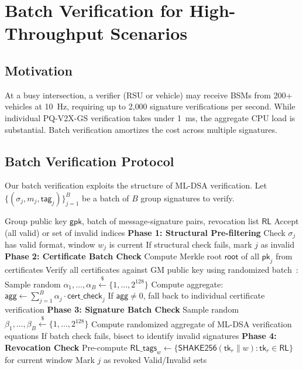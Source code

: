\documentclass[conference,10pt]{IEEEtran}
\newcommand{\shake}{\textsf{SHAKE256}}
\begin{document}
\section{Batch Verification for High-Throughput Scenarios}
\label{sec:batch}

\subsection{Motivation}

At a busy intersection, a verifier (RSU or vehicle) may receive BSMs from 200+ vehicles at 10~Hz, requiring up to 2{,}000 signature verifications per second. While individual PQ-V2X-GS verification takes under 1~ms, the aggregate CPU load is substantial. Batch verification amortizes the cost across multiple signatures.

\subsection{Batch Verification Protocol}

Our batch verification exploits the structure of ML-DSA verification. Let $\{(\sigma_j, m_j, \mathsf{tag}_j)\}_{j=1}^{B}$ be a batch of $B$ group signatures to verify.

\begin{algorithm}[h]
\caption{$\mathsf{BatchVerify}(\mathsf{gpk}, \{(m_j, \sigma_j)\}_{j=1}^B, \mathsf{RL})$}
\label{alg:batch}
\begin{algorithmic}[1]
\REQUIRE Group public key $\mathsf{gpk}$, batch of message-signature pairs, revocation list $\mathsf{RL}$
\ENSURE Accept (all valid) or set of invalid indices
\STATE \textbf{Phase 1: Structural Pre-filtering}
    \STATE Check $\sigma_j$ has valid format, window $w_j$ is current
    \STATE If structural check fails, mark $j$ as invalid
\ENDFOR
\STATE \textbf{Phase 2: Certificate Batch Check}
\STATE Compute Merkle root $\mathsf{root}$ of all $\mathsf{pk}_j$ from certificates
\STATE Verify all certificates against GM public key using randomized batch~\cite{bellare1998}:
\STATE Sample random $\alpha_1, \ldots, \alpha_B \xleftarrow{\$} \{1, \ldots, 2^{128}\}$
\STATE Compute aggregate: $\mathsf{agg} \leftarrow \sum_{j=1}^{B} \alpha_j \cdot \mathsf{cert\_check}_j$
\STATE If $\mathsf{agg} \neq 0$, fall back to individual certificate verification
\STATE \textbf{Phase 3: Signature Batch Check}
\STATE Sample random $\beta_1, \ldots, \beta_B \xleftarrow{\$} \{1, \ldots, 2^{128}\}$
\STATE Compute randomized aggregate of ML-DSA verification equations
\STATE If batch check fails, bisect to identify invalid signatures
\STATE \textbf{Phase 4: Revocation Check}
\STATE Pre-compute $\mathsf{RL\_tags}_w \leftarrow \{\shake(\mathsf{tk}_r \| w) : \mathsf{tk}_r \in \mathsf{RL}\}$ for current window
        \STATE Mark $j$ as revoked
    \ENDIF
\ENDFOR
\RETURN Valid/Invalid sets
\end{algorithmic}
\end{algorithm}
\end{document}
